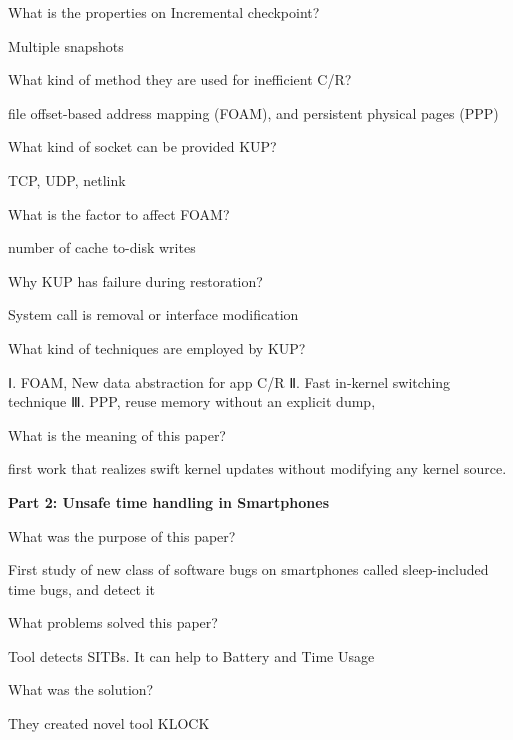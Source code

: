 \documentclass[addpoints, answers,  10pt]{exam}
\begin{document}
\begin{questions}
\question What is the properties on Incremental checkpoint?
\begin{solutionorlines}[2cm]
 Multiple snapshots
\end{solutionorlines}

\newpage
\question What kind of method they are used for inefficient C/R?
\begin{solutionorlines}[2cm]
 file offset-based address mapping (FOAM), and persistent physical pages (PPP)
\end{solutionorlines}


\question What kind of socket can be provided KUP?
\begin{solutionorlines}[2cm]
 TCP, UDP, netlink
\end{solutionorlines}


\question What is the factor to affect FOAM?
\begin{solutionorlines}[2cm]
 number of cache to-disk writes
\end{solutionorlines}



\question Why KUP has failure during restoration?
\begin{solutionorlines}[2cm]
 System call is removal or interface modification
\end{solutionorlines}


\question What kind of techniques are employed by KUP?
\begin{solutionorlines}[2cm]
Ⅰ. FOAM, New data abstraction for app C/R
	    Ⅱ. Fast in-kernel switching technique
          Ⅲ. PPP, reuse memory without an explicit dump,
\end{solutionorlines}


\question What is the meaning of this paper?
\begin{solutionorlines}[2cm]
 first work that realizes swift kernel updates without modifying any kernel source. 
\end{solutionorlines}


{\bfseries Part 2: Unsafe time handling in Smartphones }



\question What was the purpose of this paper?
\begin{solutionorlines}[2cm]
 First study of new class of software bugs on smartphones called sleep-included time bugs, and detect it
\end{solutionorlines}

\question What problems solved this paper?
\begin{solutionorlines}[2cm]
 Tool detects SITBs. It can help to Battery and Time Usage
\end{solutionorlines}
\newpage
\question What was the solution?
\begin{solutionorlines}[2cm]
 They created novel tool KLOCK
\end{solutionorlines}


\end{questions}
\end{document}
